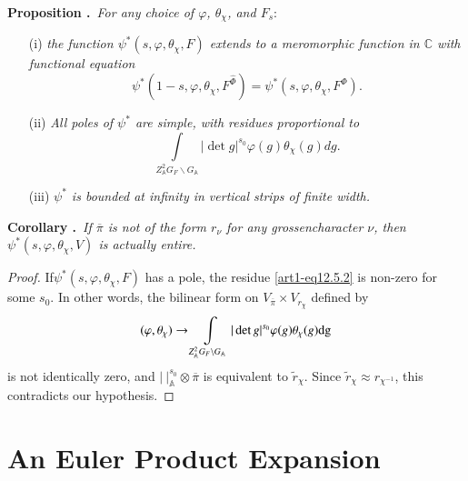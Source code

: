 \noindent
{\bf Proposition .\label{art1-prop12.5}}~{\em For any choice of $\varphi$, $\theta_{\chi}$, and $F_{s}:$}
\begin{itemize}
\item[(i)] {\em the function $\psi^{*}(s,\varphi,\theta_{\chi},F)$ extends to a meromorphic function in $\mathbb{C}$ with functional equation}
\setcounter{subsection}{5}
\setcounter{equation}{0}
\begin{equation}
\psi^{*}(1-s,\varphi,\theta_{\chi},F^{\widehat{\Phi}})=\psi^{*}(s,\varphi,\theta_{\chi},F^{\Phi}).\label{art1-eq12.5.1}
\end{equation}

\item[(ii)] {\em All poles of $\psi^{*}$ are simple, with residues proportional to}
\begin{equation}
\int\limits_{Z^{2}_{\mathbb{A}}G_{F}\backslash G_{\mathbb{A}}}|\det g|^{s_{0}}\varphi(g)\theta_{\chi}(g)dg.\label{art1-eq12.5.2}
\end{equation}

\item[(iii)] {\em $\psi^{*}$ is bounded at infinity in vertical strips of finite width.}
\end{itemize}

\medskip
\noindent
{\bf Corollary .\label{art1-coro12.6}}~{\em If $\overline{\pi}$ is not of the form $r_{\nu}$ for any grossencharacter $\nu$, then $\psi^{*}(s,\varphi,\theta_{\chi},V)$ is actually entire.}

\begin{proof}
If\pageoriginale $\psi^{*}(s,\varphi,\theta_{\chi},F)$ has a pole, the residue \eqref{art1-eq12.5.2} is non-zero for some $s_{0}$. In other words, the bilinear form on $V_{\overline{\pi}}\times V_{r_{\chi}}$ defined by
$$
(\varphi,\theta_{\chi})\to \int\limits_{Z^{2}_{\mathbb{A}}G_{F}\backslash G_{\mathbb{A}}}|\det g|^{s_{0}}\varphi(g)\theta_{\chi}(g)\mathrm{dg}
$$
is not identically zero, and $|~|^{s_{0}}_{\mathbb{A}}\otimes\overline{\pi}$ is equivalent to $\widetilde{r}_{\chi}$. Since $\widetilde{r}_{\chi}\approx r_{\chi^{-1}}$, this contradicts our hypothesis.
\end{proof}

\section{An Euler Product Expansion}\label{art1-sec13}

